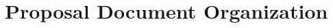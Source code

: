 \documentclass[12pt,vi,oneside,table]{report}
\begin{document}
\begin{enumerate}
    \end{enumerate}


    \section{Proposal Document Organization}
\end{document}
